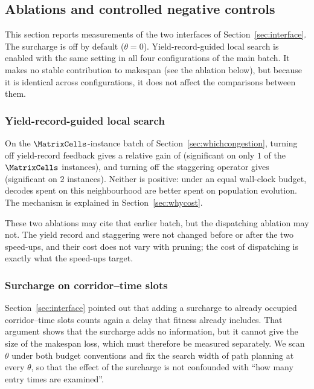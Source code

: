 \subsection{Ablations and controlled negative controls}
\label{sec:pricing}

This section reports measurements of the two interfaces of Section~\ref{sec:interface}. The surcharge is off by default ($\theta=0$). Yield-record-guided local search is enabled with the same setting in all four configurations of the main batch. It makes no stable contribution to makespan (see the ablation below), but because it is identical across configurations, it does not affect the comparisons between them.

\subsubsection{Yield-record-guided local search}
On the $\MatrixCells$-instance batch of Section~\ref{sec:whichcongestion}, turning off yield-record feedback gives a relative gain of \GainCertMatrix{} (significant on only $1$ of the $\MatrixCells$ instances), and turning off the staggering operator gives \GainStaggerMatrix{} (significant on $2$ instances). Neither is positive: under an equal wall-clock budget, decodes spent on this neighbourhood are better spent on population evolution. The mechanism is explained in Section~\ref{sec:whycost}.

These two ablations may cite that earlier batch, but the dispatching ablation may not. The yield record and staggering were not changed before or after the two speed-ups, and their cost does not vary with pruning; the cost of dispatching is exactly what the speed-ups target.

\subsubsection{Surcharge on corridor--time slots}
Section~\ref{sec:interface} pointed out that adding a surcharge to already occupied corridor--time slots counts again a delay that fitness already includes. That argument shows that the surcharge adds no information, but it cannot give the size of the makespan loss, which must therefore be measured separately.
We scan $\theta$ under both budget conventions and fix the search width of path planning at every $\theta$, so that the effect of the surcharge is not confounded with ``how many entry times are examined''.

